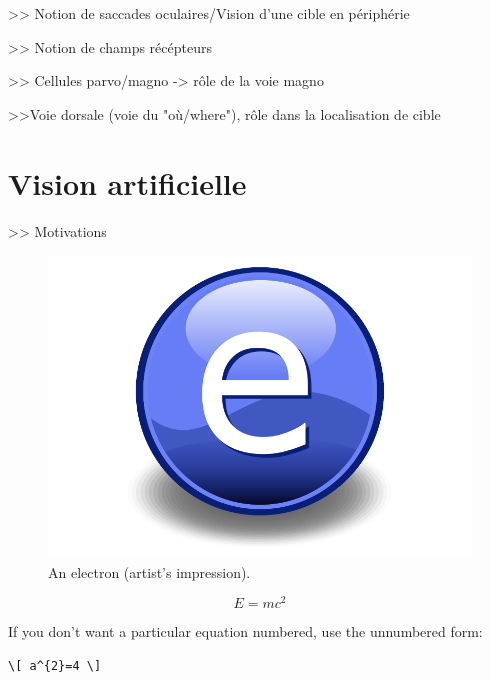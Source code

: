>> Notion de saccades oculaires/Vision d'une cible en périphérie

>> Notion de champs récépteurs

>> Cellules parvo/magno -> rôle de la voie magno

>>Voie dorsale (voie du "où/where"), rôle dans la localisation de cible


\section{Vision artificielle}
>> Motivations

\begin{figure}[th]
\centering
\includegraphics{Figures/Electron}
\decoRule %
\caption[Figure  1]{An electron (artist's impression).}
\label{fig:Electron}
\end{figure}

\begin{equation}
E = mc^{2}
\label{eqn:Einstein}
\end{equation}

If you don't want a particular equation numbered, use the unnumbered form:
\begin{verbatim}
\[ a^{2}=4 \]
\end{verbatim}
